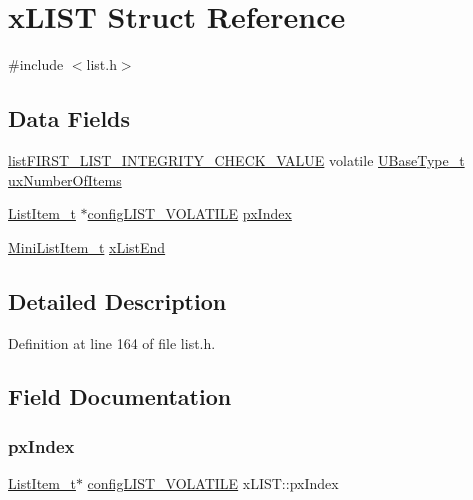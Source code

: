 \hypertarget{structx_l_i_s_t}{}\section{x\+L\+I\+ST Struct Reference}
\label{structx_l_i_s_t}


{\ttfamily \#include $<$list.\+h$>$}

\subsection*{Data Fields}
\begin{DoxyCompactItemize}
\item 
\hyperlink{list_8h_a3a52b5a4f70d3a07e37a5814a23ba880}{list\+F\+I\+R\+S\+T\+\_\+\+L\+I\+S\+T\+\_\+\+I\+N\+T\+E\+G\+R\+I\+T\+Y\+\_\+\+C\+H\+E\+C\+K\+\_\+\+V\+A\+L\+UE} volatile \hyperlink{portmacro_8h_a646f89d4298e4f5afd522202b11cb2e6}{U\+Base\+Type\+\_\+t} \hyperlink{structx_l_i_s_t_aa280e17bf4e71f81c449c2444cb70378}{ux\+Number\+Of\+Items}
\item 
\hyperlink{list_8h_a1a62d469392f9bfe2443e7efab9c8398}{List\+Item\+\_\+t} $\ast$\hyperlink{list_8h_a2d5de557c5561c8980d1bf51d87d8cba}{config\+L\+I\+S\+T\+\_\+\+V\+O\+L\+A\+T\+I\+LE} \hyperlink{structx_l_i_s_t_a7bf64d87701493b4c8c5c977682500d7}{px\+Index}
\item 
\hyperlink{list_8h_a542a8d55e98bc407593979e61f83cd02}{Mini\+List\+Item\+\_\+t} \hyperlink{structx_l_i_s_t_a49ad62fa153126e27e273811167b336a}{x\+List\+End}
\end{DoxyCompactItemize}


\subsection{Detailed Description}


Definition at line 164 of file list.\+h.



\subsection{Field Documentation}
\mbox{\label{structx_l_i_s_t_a7bf64d87701493b4c8c5c977682500d7}} 
\subsubsection{\texorpdfstring{px\+Index}{pxIndex}}
{\footnotesize\ttfamily \hyperlink{list_8h_a1a62d469392f9bfe2443e7efab9c8398}{List\+Item\+\_\+t}$\ast$ \hyperlink{list_8h_a2d5de557c5561c8980d1bf51d87d8cba}{config\+L\+I\+S\+T\+\_\+\+V\+O\+L\+A\+T\+I\+LE} x\+L\+I\+S\+T\+::px\+Index}



